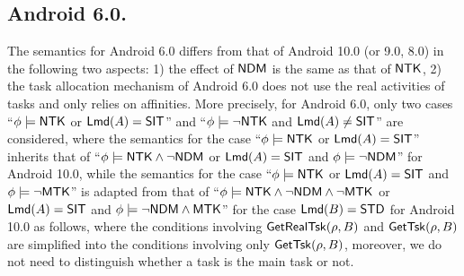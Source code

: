 
\subsection{Android 6.0.}
The semantics for Android 6.0 differs from that of Android 10.0 (or 9.0, 8.0) in the following two aspects: 1) the effect of ${\sf NDM}$ is the same as that of ${\sf NTK}$, 2) the task allocation mechanism of Android 6.0 does not use the real activities of tasks and only relies on affinities. 
%
More precisely, for Android 6.0, only two cases ``$\phi \models {\sf NTK}$ or ${\sf Lmd}(A) = {\sf SIT}$'' and ``$\phi  \models \neg {\sf NTK}$ and ${\sf Lmd}(A)\neq{\sf SIT}$'' are considered, where the semantics for the case ``$\phi \models {\sf NTK}$ or ${\sf Lmd}(A) = {\sf SIT}$'' inherits that of ``$\phi \models {\sf NTK} \wedge \neg {\sf NDM}$ or ${\sf Lmd}(A) = {\sf SIT}$ and $\phi\models\neg{\sf NDM}$'' for Android 10.0, while the semantics for the case ``$\phi  \models {\sf NTK}$ or ${\sf Lmd}(A) = {\sf SIT}$ and $\phi\models\neg{\sf MTK}$'' is adapted from that of ``$\phi \models {\sf NTK} \wedge \neg {\sf NDM}\wedge\neg{\sf MTK}$ or ${\sf Lmd}(A) = {\sf SIT}$ and $\phi\models\neg{\sf NDM}\wedge{\sf MTK}$'' for the case ${\sf Lmd}(B) = {\sf STD}$ for Android 10.0 as follows, where the conditions involving $\mathsf{GetRealTsk}(\rho, B)$ and $\mathsf{GetTsk}(\rho, B)$ are simplified into the conditions involving only $\mathsf{GetTsk}(\rho, B)$, moreover, we do not need to distinguish whether a task is the main task or not.  
